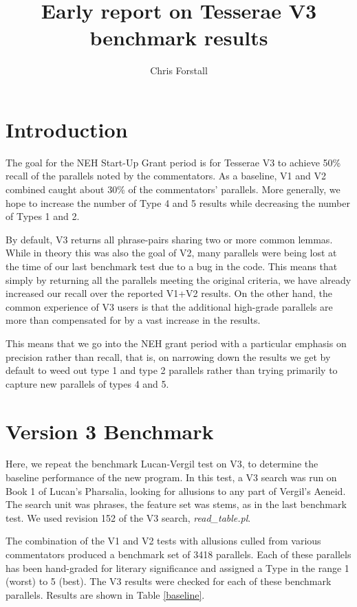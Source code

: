 \documentclass[11pt]{article}
\begin{document}
	\title{Early report on Tesserae V3 benchmark results}
	\author{Chris Forstall}

	\maketitle
	
	\section{Introduction}
	
	The goal for the NEH Start-Up Grant period is for Tesserae V3 to achieve 50\% recall of the parallels noted by the commentators. As a baseline, V1 and V2 combined caught about 30\% of the commentators' parallels.   More generally, we hope to increase the number of Type 4 and 5 results while decreasing the number of Types 1 and 2.
	
	By default, V3 returns all phrase-pairs sharing two or more common lemmas.  While in theory this was also the goal of V2, many parallels were being lost at the time of our last benchmark test due to a bug in the code.  This means that simply by returning all the parallels meeting the original criteria, we have already increased our recall over the reported V1+V2 results.  On the other hand, the common experience of V3 users is that the additional high-grade parallels are more than compensated for by a vast increase in the results.
	
	This means that we go into the NEH grant period with a particular emphasis on precision rather than recall, that is, on narrowing down the results we get by default to weed out type 1 and type 2 parallels rather than trying primarily to capture new parallels of types 4 and 5.
	
	\section{Version 3 Benchmark}
	
	Here, we repeat the benchmark Lucan-Vergil test on V3, to determine the baseline performance of the new program.  In this test, a V3 search was run on Book 1 of Lucan's Pharsalia, looking for allusions to any part of Vergil's Aeneid.  The search unit was phrases, the feature set was stems, as in the last benchmark test.  We used revision 152 of the V3 search, \emph{read_table.pl}.
	
	The combination of the V1 and V2 tests with allusions culled from various commentators produced a benchmark set of 3418 parallels.  Each of these parallels has been hand-graded for literary significance and assigned a Type in the range 1 (worst) to 5 (best).  The V3 results were checked for each of these benchmark parallels.  Results are shown in Table \ref{baseline}.
	
\end{document}
